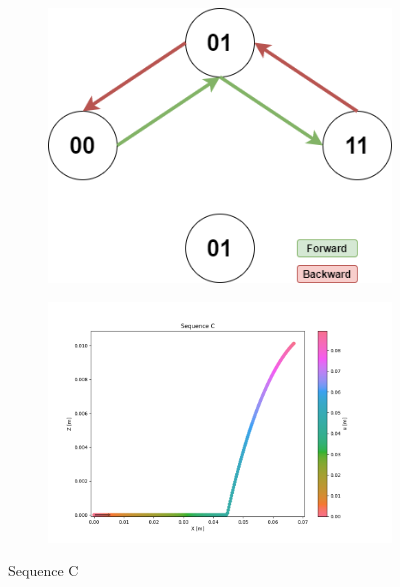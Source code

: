         \begin{figure}[h]
            \begin{subfigure}{.3\textwidth}
            \includegraphics[width=\textwidth]{images/Sequences-Sequence C.png}
            \end{subfigure}%
            \begin{subfigure}{.7\textwidth}
            \includegraphics[width=\textwidth]{images/C.png}
            \end{subfigure}
            \caption{Sequence C}
        \end{figure}
